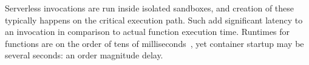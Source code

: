 Serverless invocations are run inside isolated sandboxes, and creation of these typically happens on the critical execution path.
Such  add significant latency to an invocation in comparison to actual function execution time.
Runtimes for functions are on the order of tens of milliseconds~\cite{shahrad2020serverless}, yet container startup may be several seconds: an order magnitude delay.

